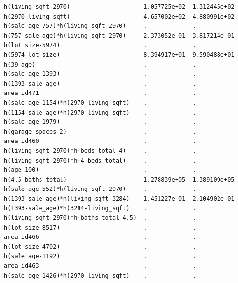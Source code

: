 \documentclass[
]{article}
\begin{document}
\begin{verbatim}
h(living_sqft-2970)                     1.057725e+02  1.312445e+02
h(2970-living_sqft)                    -4.657002e+02 -4.880991e+02
h(sale_age-757)*h(living_sqft-2970)     .             .           
h(757-sale_age)*h(living_sqft-2970)     2.373052e-01  3.817214e-01
h(lot_size-5974)                        .             .           
h(5974-lot_size)                       -8.394917e+01 -9.590488e+01
h(39-age)                               .             .           
h(sale_age-1393)                        .             .           
h(1393-sale_age)                        .             .           
area_id471                              .             .           
h(sale_age-1154)*h(2970-living_sqft)    .             .           
h(1154-sale_age)*h(2970-living_sqft)    .             .           
h(sale_age-1979)                        .             .           
h(garage_spaces-2)                      .             .           
area_id460                              .             .           
h(living_sqft-2970)*h(beds_total-4)     .             .           
h(living_sqft-2970)*h(4-beds_total)     .             .           
h(age-100)                              .             .           
h(4.5-baths_total)                     -1.278839e+05 -1.389109e+05
h(sale_age-552)*h(living_sqft-2970)     .             .           
h(1393-sale_age)*h(living_sqft-3284)    1.451227e-01  2.104902e-01
h(1393-sale_age)*h(3284-living_sqft)    .             .           
h(living_sqft-2970)*h(baths_total-4.5)  .             .           
h(lot_size-8517)                        .             .           
area_id466                              .             .           
h(lot_size-4702)                        .             .           
h(sale_age-1192)                        .             .           
area_id463                              .             .           
h(sale_age-1426)*h(2970-living_sqft)    .             .           
                                                                  

\end{verbatim}
\end{document}
